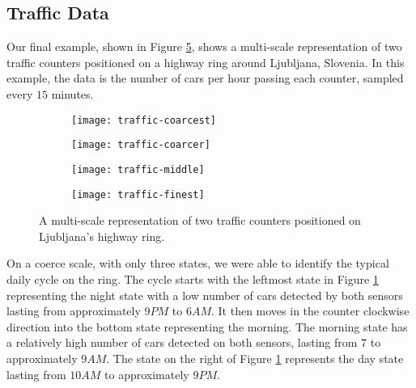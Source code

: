 \subsection{Traffic Data}

Our final example, shown in Figure \ref{fig:example-traffic-multiscale}, shows a multi-scale representation of two traffic counters positioned on a highway ring around Ljubljana, Slovenia. In this example, the data is the number of cars per hour passing each counter, sampled every $15$ minutes.  

\begin{figure}[h!]
  	\centering
  	\begin{subfigure}[b]{.48\columnwidth}
	  	\centering
	  	\texttt{[image: traffic-coarcest]}
  		\caption{\label{fig:traffic-coarcest}}
	\end{subfigure}
  	\begin{subfigure}[b]{.48\columnwidth}
	  	\centering
	  	\texttt{[image: traffic-coarcer]}
  		\caption{\label{fig:traffic-coarcer}}
	\end{subfigure}
	\begin{subfigure}[b]{.48\columnwidth}
	  	\centering
	  	\texttt{[image: traffic-middle]}
  		\caption{\label{fig:traffic-middle} }
	\end{subfigure}
	\begin{subfigure}[b]{.48\columnwidth}
	  	\centering
	  	\texttt{[image: traffic-finest]}
  		\caption{\label{fig:traffic-finest}}
	\end{subfigure}
  	\caption{A multi-scale representation of two traffic counters positioned on Ljubljana's highway ring.}
  	\label{fig:example-traffic-multiscale}
\end{figure}

On a coerce scale, with only three states, we were able to identify the typical daily cycle on the ring. The cycle starts with the leftmost state in Figure \ref{fig:traffic-coarcest} representing the night state with a low number of cars detected by both sensors lasting from approximately $9PM$ to $6AM$. It then moves in the counter clockwise direction into the bottom state representing the morning. The morning state has a relatively high number of cars detected on both sensors, lasting from $7$ to approximately $9AM$. The state on the right of Figure \ref{fig:traffic-coarcest} represents the day state lasting from $10AM$ to approximately $9PM$.

